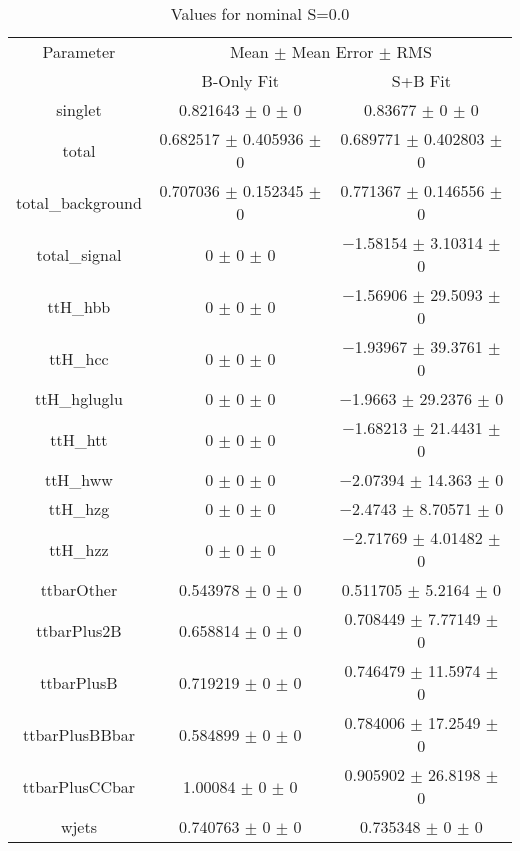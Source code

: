 \begin{table}
\centering
\caption{Values for nominal S=0.0}
\begin{tabular}{ccc}
\toprule
Parameter & \multicolumn{2}{c}{Mean $\pm$ Mean Error $\pm$ RMS}\\
 & B-Only Fit & S+B Fit\\
\midrule
singlet & \num{0.821643} $\pm$ \num{0} $\pm$ \num{0} & \num{0.83677} $\pm$ \num{0} $\pm$ \num{0}\\
total & \num{0.682517} $\pm$ \num{0.405936} $\pm$ \num{0} & \num{0.689771} $\pm$ \num{0.402803} $\pm$ \num{0}\\
total\_background & \num{0.707036} $\pm$ \num{0.152345} $\pm$ \num{0} & \num{0.771367} $\pm$ \num{0.146556} $\pm$ \num{0}\\
total\_signal & \num{0} $\pm$ \num{0} $\pm$ \num{0} & \num{-1.58154} $\pm$ \num{3.10314} $\pm$ \num{0}\\
ttH\_hbb & \num{0} $\pm$ \num{0} $\pm$ \num{0} & \num{-1.56906} $\pm$ \num{29.5093} $\pm$ \num{0}\\
ttH\_hcc & \num{0} $\pm$ \num{0} $\pm$ \num{0} & \num{-1.93967} $\pm$ \num{39.3761} $\pm$ \num{0}\\
ttH\_hgluglu & \num{0} $\pm$ \num{0} $\pm$ \num{0} & \num{-1.9663} $\pm$ \num{29.2376} $\pm$ \num{0}\\
ttH\_htt & \num{0} $\pm$ \num{0} $\pm$ \num{0} & \num{-1.68213} $\pm$ \num{21.4431} $\pm$ \num{0}\\
ttH\_hww & \num{0} $\pm$ \num{0} $\pm$ \num{0} & \num{-2.07394} $\pm$ \num{14.363} $\pm$ \num{0}\\
ttH\_hzg & \num{0} $\pm$ \num{0} $\pm$ \num{0} & \num{-2.4743} $\pm$ \num{8.70571} $\pm$ \num{0}\\
ttH\_hzz & \num{0} $\pm$ \num{0} $\pm$ \num{0} & \num{-2.71769} $\pm$ \num{4.01482} $\pm$ \num{0}\\
ttbarOther & \num{0.543978} $\pm$ \num{0} $\pm$ \num{0} & \num{0.511705} $\pm$ \num{5.2164} $\pm$ \num{0}\\
ttbarPlus2B & \num{0.658814} $\pm$ \num{0} $\pm$ \num{0} & \num{0.708449} $\pm$ \num{7.77149} $\pm$ \num{0}\\
ttbarPlusB & \num{0.719219} $\pm$ \num{0} $\pm$ \num{0} & \num{0.746479} $\pm$ \num{11.5974} $\pm$ \num{0}\\
ttbarPlusBBbar & \num{0.584899} $\pm$ \num{0} $\pm$ \num{0} & \num{0.784006} $\pm$ \num{17.2549} $\pm$ \num{0}\\
ttbarPlusCCbar & \num{1.00084} $\pm$ \num{0} $\pm$ \num{0} & \num{0.905902} $\pm$ \num{26.8198} $\pm$ \num{0}\\
wjets & \num{0.740763} $\pm$ \num{0} $\pm$ \num{0} & \num{0.735348} $\pm$ \num{0} $\pm$ \num{0}\\
\bottomrule
\end{tabular}
\end{table}